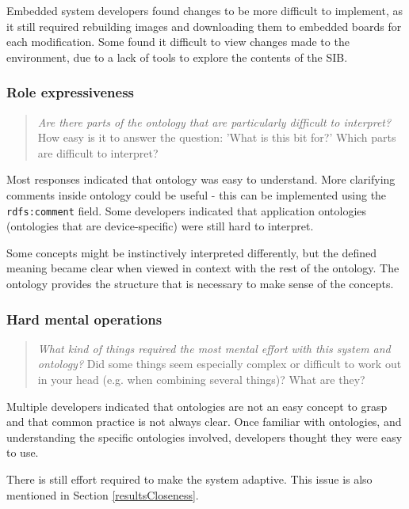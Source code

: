 Embedded system developers found changes to be more difficult to implement, as it still required rebuilding images and downloading them to embedded boards for each modification. Some found it difficult to view changes made to the environment, due to a lack of tools to explore the contents of the \ac{SIB}.


\subsubsection{Role expressiveness}

\begin{quote}
	\emph{Are there parts of the ontology that are particularly difficult to interpret?}
	How easy is it to answer the question: 'What is this bit for?' Which parts are difficult to interpret?
\end{quote}

Most responses indicated that ontology was easy to understand. More clarifying comments inside ontology could be useful - this can be implemented using the \texttt{rdfs:comment} field. Some developers indicated that application ontologies (ontologies that are device-specific) were still hard to interpret. 

Some concepts might be instinctively interpreted differently, but the defined meaning became clear when viewed in context with the rest of the ontology. The ontology provides the structure that is necessary to make sense of the concepts.


\subsubsection{Hard mental operations}

\begin{quote}
	\emph{What kind of things required the most mental effort with this system and ontology?}
	Did some things seem especially complex or difficult to work out in your head (e.g. when combining several things)? What are they?
\end{quote}

Multiple developers indicated that ontologies are not an easy concept to grasp and that common practice is not always clear. Once familiar with ontologies, and understanding the specific ontologies involved, developers thought they were easy to use.  

There is still effort required to make the system adaptive. This issue is also mentioned in Section \ref{resultsCloseness}.


